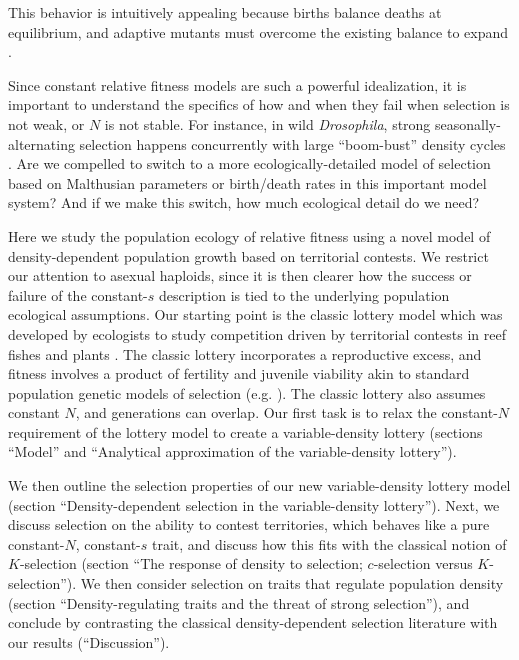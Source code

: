 \documentclass[12pt]{article}
\begin{document}
This behavior is intuitively appealing because births balance deaths at equilibrium, and adaptive mutants must overcome the existing balance to expand \citep[pp. 227]{kostitzin_1939}.





Since constant relative fitness models are such a powerful idealization, it is important to understand the specifics of how and when they fail when selection is not weak, or $N$ is not stable. For instance, in wild \textit{Drosophila}, strong seasonally-alternating selection happens concurrently with large ``boom-bust'' density cycles \citep{messer_2016,bergland_14}. Are we compelled to switch to a more ecologically-detailed model of selection based on Malthusian parameters or birth/death rates in this important model system? And if we make this switch, how much ecological detail do we need? 

\citep{charlesworth_1971,kimura_1978,leon_1978,nagylaki_1979}



Here we study the population ecology of relative fitness using a novel model of density-dependent population growth based on territorial contests. We restrict our attention to asexual haploids, since it is then clearer how the success or failure of the constant-$s$ description is tied to the underlying population ecological assumptions. Our starting point is the classic lottery model which was developed by ecologists to study competition driven by territorial contests in reef fishes and plants \citep{sale_77,chesson_1981}. The classic lottery incorporates a reproductive excess, and fitness involves a product of fertility and juvenile viability akin to standard population genetic models of selection (e.g. \citealt[pp. 185]{crow_1970}). The classic lottery also assumes constant $N$, and generations can overlap. Our first task is to relax the constant-$N$ requirement of the lottery model to create a variable-density lottery (sections ``Model'' and ``Analytical approximation of the variable-density lottery''). 

We then outline the selection properties of our new variable-density lottery model (section ``Density-dependent selection in the variable-density lottery''). Next, we discuss
selection on the ability to contest territories, which behaves like a pure constant-$N$, constant-$s$ trait, and discuss how this fits with the classical notion of $K$-selection  (section ``The response of density to selection; $c$-selection versus $K$-selection''). We then consider selection on traits that regulate population density (section ``Density-regulating traits and the threat of strong selection''), and conclude by contrasting the classical density-dependent selection literature with our results (``Discussion'').
\end{document}
